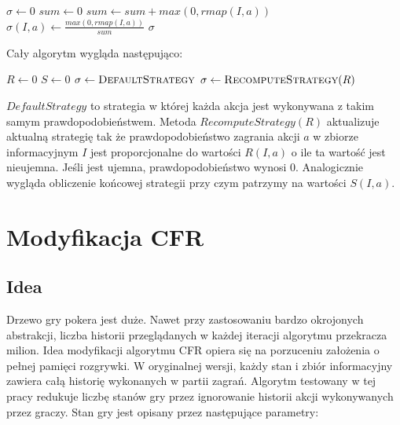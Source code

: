 \documentclass[licencjacka]{pracamgr}
\begin{document}
\begin{algorithmic}
        \State $\sigma \gets 0$
            \State $sum \gets 0$
                \State $sum \gets sum + max(0, rmap(I, a))$
            \EndFor
                \State $\sigma(I, a) \gets \frac{max(0, rmap(I, a))}{sum}$
            \EndFor
        \EndFor
        \State \Return $\sigma$
    \EndFunction
\end{algorithmic}

$\,$ \\
\noindent
Cały algorytm wygląda następująco: \\

\begin{algorithmic}
        \State $R \gets 0$
        \State $S \gets 0$
        \State $\sigma \gets \Call{DefaultStrategy}{}$
            \State {}
            \State $\sigma \gets \Call{RecomputeStrategy}{R}$
        \EndFor
        \State \Return {}
    \EndFunction
\end{algorithmic}

$\,$ \\
\noindent
$DefaultStrategy$ to strategia w której każda akcja jest wykonywana z takim samym prawdopodobieństwem. Metoda
$RecomputeStrategy(R)$ aktualizuje aktualną strategię tak że prawdopodobieństwo zagrania akcji $a$ w zbiorze informacyjnym
$I$ jest proporcjonalne do wartości $R(I, a)$ o ile ta wartość jest nieujemna. Jeśli jest ujemna, prawdopodobieństwo
wynosi $0$. Analogicznie wygląda obliczenie końcowej strategii przy czym patrzymy na wartości $S(I, a)$.

\chapter{Modyfikacja CFR}

\section{Idea}

Drzewo gry pokera jest duże. Nawet przy zastosowaniu bardzo okrojonych abstrakcji, liczba historii przeglądanych w każdej
iteracji algorytmu przekracza milion. Idea modyfikacji algorytmu CFR opiera się na porzuceniu założenia o pełnej pamięci rozgrywki.
W oryginalnej wersji, każdy stan i zbiór informacyjny zawiera całą historię wykonanych w partii zagrań. Algorytm testowany
w tej pracy redukuje liczbę stanów gry przez ignorowanie historii akcji wykonywanych
przez graczy. Stan gry jest opisany przez następujące parametry: \\
\end{document}
